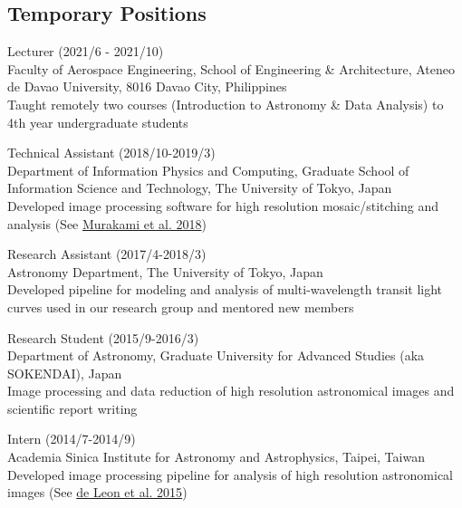 \documentclass[12pt,letterpaper]{article}
\begin{document}
\subsection{Temporary Positions}
\begin{list}{}{\cvlist}
    \item Lecturer (2021/6 - 2021/10) \\
          Faculty of Aerospace Engineering, School of Engineering \& Architecture, Ateneo de Davao University, 8016 Davao City, Philippines\\
          Taught remotely two courses (Introduction to Astronomy \& Data Analysis) to 4th year undergraduate students\\
    \item Technical Assistant (2018/10-2019/3)\\
          Department of Information Physics and Computing, Graduate School of Information Science and Technology, The University of Tokyo, Japan\\
          Developed image processing software for high resolution mosaic/stitching and analysis (See \href{\spieurl}{Murakami et al. 2018})
    \item Research Assistant (2017/4-2018/3)\\	
          Astronomy Department, The University of Tokyo, Japan\\
          Developed pipeline for modeling and analysis of multi-wavelength transit light curves used in our research group and mentored new members
    \item Research Student (2015/9-2016/3)\\
          Department of Astronomy, Graduate University for Advanced Studies (aka SOKENDAI), Japan\\
          Image processing and data reduction of high resolution astronomical images and scientific report writing
    \item Intern (2014/7-2014/9)\\
          Academia Sinica Institute for Astronomy and Astrophysics, Taipei, Taiwan\\	
          Developed image processing pipeline for analysis of high resolution astronomical images (See \href{\paperone}{de Leon et al. 2015})
\end{list}

%   
\end{document}

